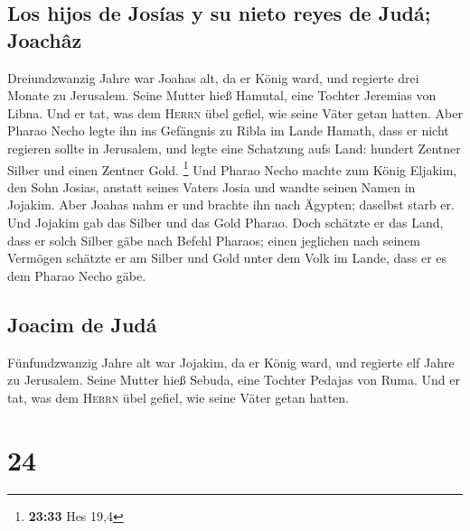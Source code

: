 \hypertarget{los-hijos-de-josuxedas-y-su-nieto-reyes-de-juduxe1-joachuxe2z}{%
\subsection{Los hijos de Josías y su nieto reyes de Judá;
Joachâz}\label{los-hijos-de-josuxedas-y-su-nieto-reyes-de-juduxe1-joachuxe2z}}

 Dreiundzwanzig Jahre war Joahas alt, da er König ward,
und regierte drei Monate zu Jerusalem. Seine Mutter hieß Hamutal, eine
Tochter Jeremias von Libna.  Und er tat, was dem
\textsc{Herrn} übel gefiel, wie seine Väter getan hatten.
 Aber Pharao Necho legte ihn ins Gefängnis zu Ribla im
Lande Hamath, dass er nicht regieren sollte in Jerusalem, und legte eine
Schatzung aufs Land: hundert Zentner Silber und einen Zentner Gold.
\footnote{\textbf{23:33} Hes 19,4}  Und Pharao Necho
machte zum König Eljakim, den Sohn Josias, anstatt seines Vaters Josia
und wandte seinen Namen in Jojakim. Aber Joahas nahm er und brachte ihn
nach Ägypten; daselbst starb er.  Und Jojakim gab das
Silber und das Gold Pharao. Doch schätzte er das Land, dass er solch
Silber gäbe nach Befehl Pharaos; einen jeglichen nach seinem Vermögen
schätzte er am Silber und Gold unter dem Volk im Lande, dass er es dem
Pharao Necho gäbe.

\hypertarget{joacim-de-juduxe1}{%
\subsection{Joacim de Judá}\label{joacim-de-juduxe1}}

 Fünfundzwanzig Jahre alt war Jojakim, da er König ward,
und regierte elf Jahre zu Jerusalem. Seine Mutter hieß Sebuda, eine
Tochter Pedajas von Ruma.  Und er tat, was dem
\textsc{Herrn} übel gefiel, wie seine Väter getan hatten.

\hypertarget{section-23}{%
\section{24}\label{section-23}}

